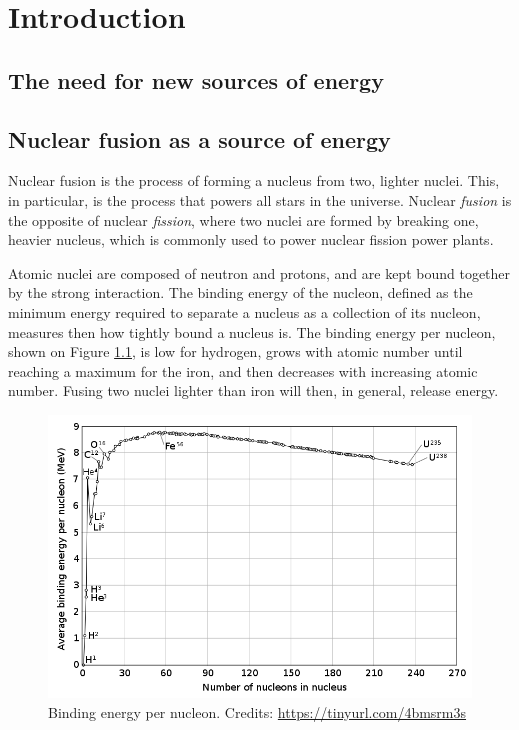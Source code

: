 \documentclass[my_thesis.tex]{subfiles}
\begin{document}
\cleardoublepage
\chapter{Introduction}

\section{The need for new sources of energy}



\section{Nuclear fusion as a source of energy}
Nuclear fusion is the process of forming a nucleus from two, lighter nuclei. This, in particular, is the process that powers all stars in the universe. Nuclear \emph{fusion} is the opposite of nuclear \emph{fission}, where two nuclei are formed by breaking one, heavier nucleus, which is commonly used to power nuclear fission power plants.

Atomic nuclei are composed of neutron and protons, and are kept bound together by the strong interaction. The binding energy of the nucleon, defined as the minimum energy required to separate a nucleus as a collection of its nucleon, measures then how tightly bound a nucleus is. The binding energy per nucleon, shown on Figure \ref{fig. binding energy}, is low for hydrogen, grows with atomic number until reaching a maximum for the iron, and then decreases with increasing atomic number. Fusing two nuclei lighter than iron will then, in general, release energy.

\begin{figure}
    \centering
    \includegraphics[width=.75\linewidth]{images/introduction/BindingEnergy.png}
    \caption{Binding energy per nucleon. Credits: \url{https://tinyurl.com/4bmsrm3s}}
    \label{fig. binding energy}
\end{figure}
\end{document}
